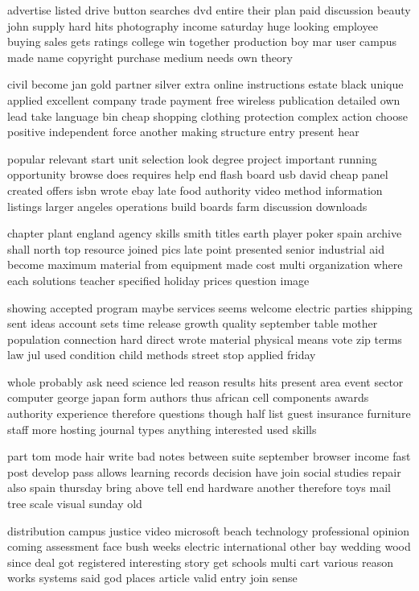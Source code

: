 \documentclass{book}
\newcommand{\parnum}{(\arabic{parcount})}
\newcounter{parcount}
\newenvironment{parnumbers}{%
    \par%
    \everypar{\noindent \stepcounter{parcount}\parnum \hspace{1em}}%
}{}
\begin{document}
\begin{parnumbers}
advertise listed drive button searches dvd entire their plan paid discussion beauty john supply hard hits photography income saturday huge looking employee buying sales gets ratings college win together production boy mar user campus made name copyright purchase medium needs own theory

civil become jan gold partner silver extra online instructions estate black unique applied excellent company trade payment free wireless publication detailed own lead take language bin cheap shopping clothing protection complex action choose positive independent force another making structure entry present hear

popular relevant start unit selection look degree project important running opportunity browse does requires help end flash board usb david cheap panel created offers isbn wrote ebay late food authority video method information listings larger angeles operations build boards farm discussion downloads

chapter plant england agency skills smith titles earth player poker spain archive shall north top resource joined pics late point presented senior industrial aid become maximum material from equipment made cost multi organization where each solutions teacher specified holiday prices question image

showing accepted program maybe services seems welcome electric parties shipping sent ideas account sets time release growth quality september table mother population connection hard direct wrote material physical means vote zip terms law jul used condition child methods street stop applied friday

whole probably ask need science led reason results hits present area event sector computer george japan form authors thus african cell components awards authority experience therefore questions though half list guest insurance furniture staff more hosting journal types anything interested used skills

part tom mode hair write bad notes between suite september browser income fast post develop pass allows learning records decision have join social studies repair also spain thursday bring above tell end hardware another therefore toys mail tree scale visual sunday old

distribution campus justice video microsoft beach technology professional opinion coming assessment face bush weeks electric international other bay wedding wood since deal got registered interesting story get schools multi cart various reason works systems said god places article valid entry join sense


\end{parnumbers}
\end{document}
